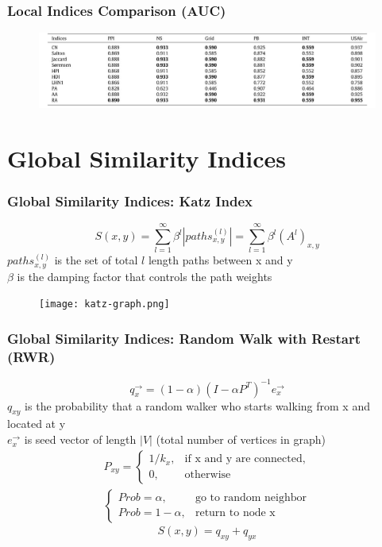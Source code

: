 \documentclass{beamer}
\begin{document}
\begin{frame}
\frametitle{Local Indices Comparison (AUC)}
\begin{figure}
  \centering
  \includegraphics[width=1\linewidth]{andrea_images/table1.jpg}
  \label{fig:table1}
\end{figure}
\end{frame}



\section{Global Similarity Indices}
\begin{frame}
  \frametitle{Global Similarity Indices: Katz Index}
    \[S(x,y) = \sum_{l=1}^{\infty} \beta^{l} |paths_{x,y}^{(l)}| = \sum_{l=1}^{\infty} \beta^{l}(A^{l})_{x,y}\]
    $paths_{x,y}^{(l)}$ is the set of total $l$ length paths between x and y\\
    $\beta$ is the damping factor that controls the path weights

\begin{figure}
\centering
  \texttt{[image: katz-graph.png]}
  \label{fig:katz-graph}
\end{figure}

\end{frame}



\begin{frame}
  \frametitle{Global Similarity Indices: Random Walk with Restart (RWR)} 
    \[q_{x}^{\rightarrow} = (1 - \alpha)(I - \alpha P^{T})^{-1}e_{x}^{\rightarrow}\]
    $q_{xy}$ is the probability that a random walker who starts walking from x and located at y\\
    $e_{x}^{\rightarrow}$ is seed vector of length $|V|$ (total number of vertices in graph)
    \begin{align}
P_{xy} =
    \begin{cases}
      1/k_{x}, & \text{if x and y are connected,} \\
      0, & \text{otherwise}
    \end{cases}\\
\begin{cases}
      Prob = \alpha, & \text{go to random neighbor}\\
      Prob = 1 - \alpha, & \text{return to node x}
    \end{cases}
\end{align}
    \[S(x,y) = q_{xy} + q_{yx}\]

\end{frame}
\end{document}
